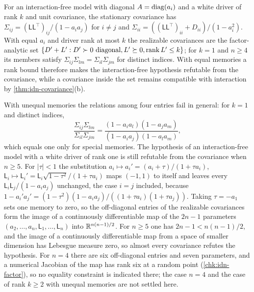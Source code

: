 \begin{remark}\label{rem:idn-factor}
For an interaction-free model with diagonal $A=\operatorname{diag}(a_i)$ and a white driver of rank $k$ and unit covariance, the stationary covariance has $\Sigma_{ij}=(\mathsf L\mathsf L^{\top})_{ij}/(1-a_ia_j)$ for $i\neq j$ and $\Sigma_{ii}=((\mathsf L\mathsf L^{\top})_{ii}+D_{ii})/(1-a_i^2)$. With equal $a_i$ and driver rank at most $k$ the realizable covariances are the factor-analytic set $\{D'+L':D'\succ0\text{ diagonal},L'\succeq0,\operatorname{rank} L'\le k\}$; for $k=1$ and $n\ge4$ its members satisfy $\Sigma_{ij}\Sigma_{lm}=\Sigma_{il}\Sigma_{jm}$ for distinct indices. With equal memories a rank bound therefore makes the interaction-free hypothesis refutable from the covariance, while a covariance inside the set remains compatible with interaction by \cref{thm:idn-covariance}(b).

With unequal memories the relations among four entries fail in general: for $k=1$ and distinct indices,
\begin{equation}\label{eq:idn-tetrad}
\frac{\Sigma_{ij}\Sigma_{lm}}{\Sigma_{il}\Sigma_{jm}}=\frac{(1-a_ia_l)(1-a_ja_m)}{(1-a_ia_j)(1-a_la_m)},
\end{equation}
which equals one only for special memories. The hypothesis of an interaction-free model with a white driver of rank one is still refutable from the covariance when $n\ge5$. For $|\tau|<1$ the substitution $a_i\mapsto a_i'=(a_i+\tau)/(1+\tau a_i)$, $\mathsf L_i\mapsto\mathsf L_i'=\mathsf L_i\sqrt{1-\tau^2}/(1+\tau a_i)$ maps $(-1,1)$ to itself and leaves every $\mathsf L_i\mathsf L_j/(1-a_ia_j)$ unchanged, the case $i=j$ included, because $1-a_i'a_j'=(1-\tau^2)(1-a_ia_j)/((1+\tau a_i)(1+\tau a_j))$. Taking $\tau=-a_1$ sets one memory to zero, so the off-diagonal entries of the realizable covariances form the image of a continuously differentiable map of the $2n-1$ parameters $(a_2,\dots,a_n,\mathsf L_1,\dots,\mathsf L_n)$ into $\mathbb{R}^{n(n-1)/2}$. For $n\ge5$ one has $2n-1<n(n-1)/2$, and the image of a continuously differentiable map from a space of smaller dimension has Lebesgue measure zero, so almost every covariance refutes the hypothesis. For $n=4$ there are six off-diagonal entries and seven parameters, and a numerical Jacobian of the map has rank six at a random point (\cref{chk:idn-factor}), so no equality constraint is indicated there; the case $n=4$ and the case of rank $k\ge2$ with unequal memories are not settled here.
\end{remark}

